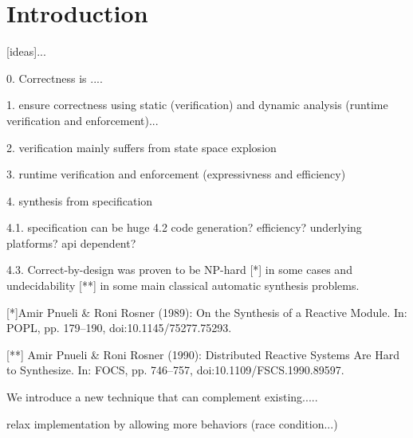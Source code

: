 \section{Introduction}
[ideas]...


0. Correctness is .... 

1. ensure correctness using static (verification) and dynamic analysis (runtime verification and enforcement)... 

2. verification mainly suffers from state space explosion 

3. runtime verification and enforcement (expressivness and efficiency)

4. synthesis from specification

4.1. specification can be huge 
4.2 code generation? efficiency? underlying platforms? api dependent? 


4.3. 
Correct-by-design was proven to be NP-hard [*] in some cases and undecidability [**]  in some main classical automatic synthesis problems.

[*]Amir Pnueli \& Roni Rosner (1989): On the Synthesis of a Reactive Module. In: POPL, pp. 179–190, doi:10.1145/75277.75293.


[**] Amir Pnueli \& Roni Rosner (1990): Distributed Reactive Systems Are Hard to Synthesize. In: FOCS, pp. 746–757, doi:10.1109/FSCS.1990.89597.



We introduce a new technique that can complement existing..... 


relax implementation by allowing more behaviors (race condition...)





